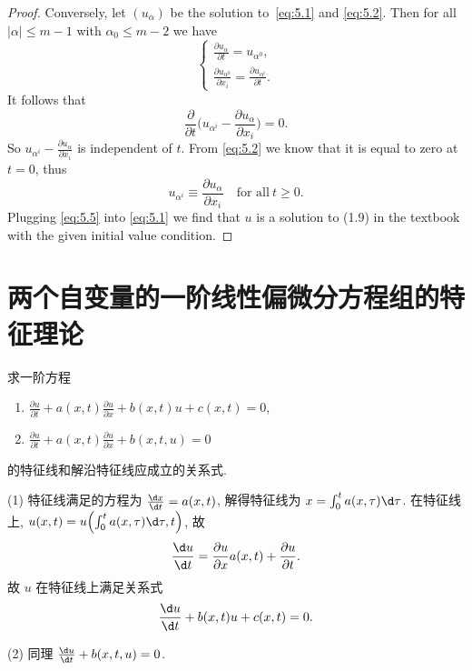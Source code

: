 \begin{proof}
  Conversely, let $(u_\alpha)$ be the solution to~\eqref{eq:5.1} and \eqref{eq:5.2}.
  Then for all $|\alpha|\leq m-1$ with $\alpha_0\leq m-2$ we have
  \begin{equation}\label{eq:5.3}
    \begin{cases}
      \frac{\partial u_\alpha}{\partial t} = u_{\alpha^0}, \\
      \frac{\partial u_{\alpha^0}}{\partial x_i} = \frac{\partial u_{\alpha^i}}{\partial t}.
    \end{cases}
  \end{equation}
  It follows that
  \begin{equation}\label{eq:5.4}
    \frac{\partial}{\partial t}\biggl(u_{\alpha^i} - \frac{\partial u_\alpha}{\partial x_i}\biggr)
      = 0.
  \end{equation}
  So $u_{\alpha^i} - \frac{\partial u_\alpha}{\partial x_i}$ is independent of $t$.
  From \eqref{eq:5.2} we know that it is equal to zero at $t=0$, thus
  \begin{equation}\label{eq:5.5}
    u_{\alpha^i} \equiv \frac{\partial u_\alpha}{\partial x_i} \quad \text{for all}\ t\geq 0.
  \end{equation}
  Plugging \eqref{eq:5.5} into \eqref{eq:5.1} we find that $u$ is a solution to (1.9)
  in the textbook with the given initial value condition.
\end{proof}

\section{两个自变量的一阶线性偏微分方程组的特征理论}

\begin{exercise}
  求一阶方程
  \begin{enumerate}[(1)]
    \item $\frac{\partial u}{\partial t} + a(x,t) \frac{\partial u}{\partial x} 
      + b(x,t)u + c(x,t) = 0$,
    \item $\frac{\partial u}{\partial t} + a(x,t) \frac{\partial u}{\partial x}
      + b(x,t,u) = 0$
  \end{enumerate}
  的特征线和解沿特征线应成立的关系式.
\end{exercise}

\begin{solve}
  (1) 特征线满足的方程为 $\frac{\d x}{\d t} = a(x,t)$,
  解得特征线为 $x = \int_0^t a(x,\tau) \d\tau$.
  在特征线上, $u(x,t) = u\Bigl(\int_0^t a(x, \tau) \d\tau, t\Bigr)$, 故
  \[\frac{\d u}{\d t} = \frac{\partial u}{\partial x} a(x,t)
    + \frac{\partial u}{\partial t}.\]
  故 $u$ 在特征线上满足关系式
  \[\frac{\d u}{\d t} + b(x,t)u + c(x,t) = 0.\]

  (2) 同理 $\frac{\d u}{\d t} + b(x,t,u) = 0$.
\end{solve}


